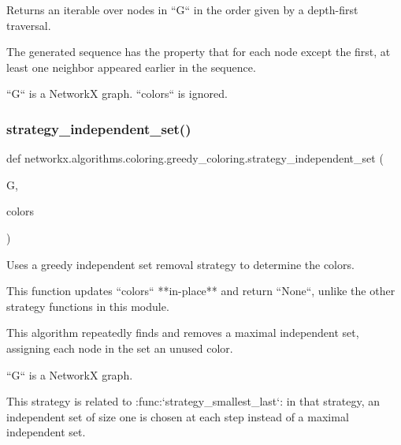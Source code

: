 \begin{DoxyVerb}Returns an iterable over nodes in ``G`` in the order given by a
depth-first traversal.

The generated sequence has the property that for each node except
the first, at least one neighbor appeared earlier in the sequence.

``G`` is a NetworkX graph. ``colors`` is ignored.\end{DoxyVerb}
 \mbox{\label{namespacenetworkx_1_1algorithms_1_1coloring_1_1greedy__coloring_a52934c3efed3eab63ae7650945303a2f}} 
\subsubsection{\texorpdfstring{strategy\+\_\+independent\+\_\+set()}{strategy\_independent\_set()}}
{\footnotesize\ttfamily def networkx.\+algorithms.\+coloring.\+greedy\+\_\+coloring.\+strategy\+\_\+independent\+\_\+set (\begin{DoxyParamCaption}\item[{}]{G,  }\item[{}]{colors }\end{DoxyParamCaption})}

\begin{DoxyVerb}Uses a greedy independent set removal strategy to determine the
colors.

This function updates ``colors`` **in-place** and return ``None``,
unlike the other strategy functions in this module.

This algorithm repeatedly finds and removes a maximal independent
set, assigning each node in the set an unused color.

``G`` is a NetworkX graph.

This strategy is related to :func:`strategy_smallest_last`: in that
strategy, an independent set of size one is chosen at each step
instead of a maximal independent set.\end{DoxyVerb}
 \mbox{\label{namespacenetworkx_1_1algorithms_1_1coloring_1_1greedy__coloring_a5b0bba67e48a8670a415e8391c1c7525}} 

